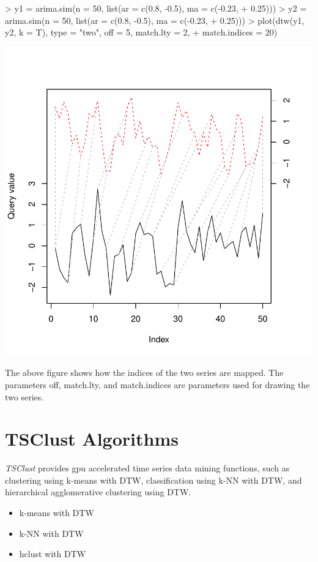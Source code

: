 \documentclass{article}
\begin{document}
\begin{Schunk}
\begin{Sinput}
> y1 = arima.sim(n = 50, list(ar = c(0.8, -0.5), ma = c(-0.23, 
+     0.25)))
> y2 = arima.sim(n = 50, list(ar = c(0.8, -0.5), ma = c(-0.23, 
+     0.25)))
> plot(dtw(y1, y2, k = T), type = "two", off = 5, match.lty = 2, 
+     match.indices = 20)
\end{Sinput}
\end{Schunk}
\includegraphics{tsclust-005}

The above figure shows how the indices of the two series are mapped.
The parameters off, match.lty, and match.indices are parameters used for drawing
the two series.

\section{TSClust Algorithms}

\textit{TSClust} provides gpu accelerated time series data mining functions, 
such as clustering using k-means with DTW, classification using k-NN with DTW, 
and hierarchical agglomerative clustering using DTW.  

\begin{itemize}
  \item k-means with DTW
  \item k-NN with DTW
  \item hclust with DTW
\end{itemize}
\end{document}
